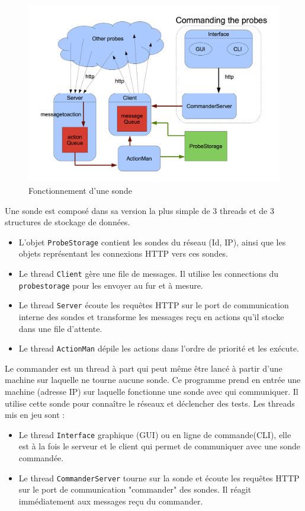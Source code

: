 \documentclass[a4paper,11pt]{article}
\newcommand{\cd}[1]{\texttt{#1}}
\begin{document}
\begin{figure}[!ht]
\centering\includegraphics[width=\linewidth]{img/graphCommander.png}
\caption{Fonctionnement d'une sonde}
\end{figure}

Une sonde est composé dans sa version la plus simple de 3 threads et de 3 structures de stockage de données.
\begin{itemize}
\item L'objet \cd{ProbeStorage} contient les sondes du réseau (Id, IP), ainsi que les objets représentant les connexions HTTP vers ces sondes.
\item Le thread \cd{Client} gère une file de messages. Il utilise les connections du \cd{probestorage} pour les envoyer au fur et à mesure.
\item Le thread \cd{Server} écoute les requêtes HTTP sur le port de communication interne des sondes et transforme les messages reçu en actions qu'il stocke dans une file d'attente.
\item Le thread \cd{ActionMan} dépile les actions dans l'ordre de priorité et les exécute.
\end{itemize}
Le commander est un thread à part qui peut même être lancé à partir d'une machine sur laquelle ne tourne aucune sonde. Ce programme prend en entrée une machine (adresse IP) sur laquelle fonctionne une sonde avec qui communiquer. Il utilise cette sonde pour connaître le réseaux et déclencher des tests.
Les threads mis en jeu sont :
\begin{itemize}
\item Le thread \cd{Interface} graphique (GUI) ou en ligne de commande(CLI), elle est à la fois le serveur et le client qui permet de communiquer avec une sonde commandée.
\item Le thread \cd{CommanderServer} tourne sur la sonde et écoute les requêtes HTTP sur le port de communication "commander" des sondes. Il réagit immédiatement aux messages reçu du commander.
\end{itemize}
\end{document}
